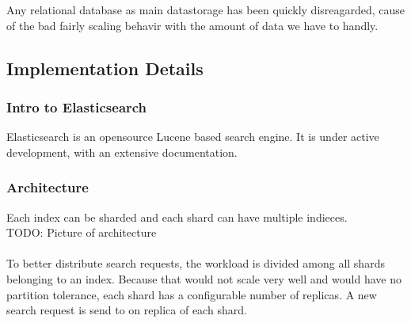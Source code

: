 Any relational database as main datastorage has been quickly disreagarded, cause of the bad fairly scaling behavir with the amount of data we have to handly.
\subsection{Implementation Details}
\subsubsection{Intro to Elasticsearch}

Elasticsearch is an opensource Lucene based search engine. It is under active development, with an extensive documentation.
\subsubsection{Architecture}
Each index can be sharded and each shard can have multiple indieces.\\

TODO: Picture of architecture\\
\\
To better distribute search requests, the workload is divided among all shards belonging to an index. Because that
would not scale very well and would have no partition tolerance,
each shard has a configurable number of replicas. A new search request is send to on replica of each shard.
